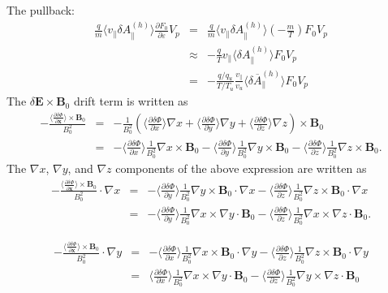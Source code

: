 \documentclass{article}
\begin{document}
The pullback:
\begin{eqnarray*}
  \frac{q}{m} \langle v_{\parallel} \delta A_{\parallel}^{(h)} \rangle
  \frac{\partial F_0}{\partial \varepsilon} V_p & = & \frac{q}{m} \langle
  v_{\parallel} \delta A_{\parallel}^{(h)} \rangle \left( - \frac{m}{T}
  \right) F_0 V_p\\
  & \approx & - \frac{q}{T} v_{\parallel} \langle \delta A_{\parallel}^{(h)}
  \rangle F_0 V_p\\
  & = & - \frac{q / q_u}{T / T_u} \frac{v_{\parallel}}{v_u} \langle \delta
  \overline{A}_{\parallel}^{(h)} \rangle F_0 V_p
\end{eqnarray*}
The $\delta \mathbf{E} \times \mathbf{B}_0$ drift term is written as
\begin{eqnarray*}
  - \frac{\langle \frac{\partial \delta \Phi}{\partial \mathbf{x}} \rangle
  \times \mathbf{B}_0}{B_0^2} & = & - \frac{1}{B_0^2} \left( \langle
  \frac{\partial \delta \Phi}{\partial x} \rangle \nabla x + \langle
  \frac{\partial \delta \Phi}{\partial y} \rangle \nabla y + \langle
  \frac{\partial \delta \Phi}{\partial z} \rangle \nabla z \right) \times
  \mathbf{B}_0\\
  & = & - \langle \frac{\partial \delta \Phi}{\partial x} \rangle
  \frac{1}{B_0^2} \nabla x \times \mathbf{B}_0 - \langle \frac{\partial \delta
  \Phi}{\partial y} \rangle \frac{1}{B_0^2} \nabla y \times \mathbf{B}_0 -
  \langle \frac{\partial \delta \Phi}{\partial z} \rangle \frac{1}{B_0^2}
  \nabla z \times \mathbf{B}_0 .
\end{eqnarray*}
The $\nabla x$, $\nabla y$, and $\nabla z$ components of the above expression
are written as
\begin{eqnarray}
  - \frac{\langle \frac{\partial \delta \Phi}{\partial \mathbf{x}} \rangle
  \times \mathbf{B}_0}{B_0^2} \cdot \nabla x & = & - \langle \frac{\partial
  \delta \Phi}{\partial y} \rangle \frac{1}{B_0^2} \nabla y \times
  \mathbf{B}_0 \cdot \nabla x - \langle \frac{\partial \delta \Phi}{\partial
  z} \rangle \frac{1}{B_0^2} \nabla z \times \mathbf{B}_0 \cdot \nabla x
  \nonumber\\
  & = & - \langle \frac{\partial \delta \Phi}{\partial y} \rangle
  \frac{1}{B_0^2} \nabla x \times \nabla y \cdot \mathbf{B}_0 - \langle
  \frac{\partial \delta \Phi}{\partial z} \rangle \frac{1}{B_0^2} \nabla x
  \times \nabla z \cdot \mathbf{B}_0 . 
\end{eqnarray}

\begin{eqnarray}
  - \frac{\langle \frac{\partial \delta \Phi}{\partial \mathbf{x}} \rangle
  \times \mathbf{B}_0}{B_0^2} \cdot \nabla y & = & - \langle \frac{\partial
  \delta \Phi}{\partial x} \rangle \frac{1}{B_0^2} \nabla x \times
  \mathbf{B}_0 \cdot \nabla y - \langle \frac{\partial \delta \Phi}{\partial
  z} \rangle \frac{1}{B_0^2} \nabla z \times \mathbf{B}_0 \cdot \nabla y
  \nonumber\\
  & = & \langle \frac{\partial \delta \Phi}{\partial x} \rangle
  \frac{1}{B_0^2} \nabla x \times \nabla y \cdot \mathbf{B}_0 - \langle
  \frac{\partial \delta \Phi}{\partial z} \rangle \frac{1}{B_0^2} \nabla y
  \times \nabla z \cdot \mathbf{B}_0 
\end{eqnarray}
\end{document}
